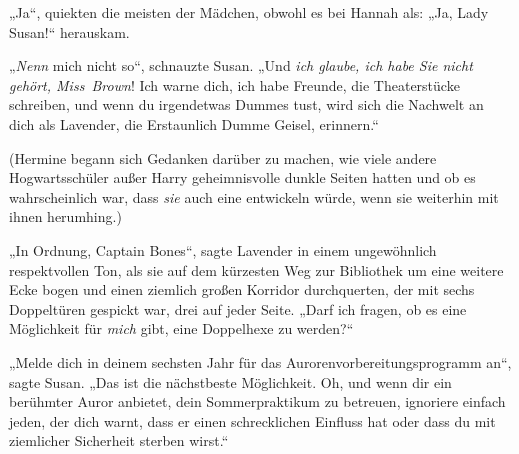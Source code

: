 „Ja“, quiekten die meisten der Mädchen, obwohl es bei Hannah als: „Ja, Lady Susan!“ herauskam.

„\emph{Nenn} mich nicht so“, schnauzte Susan. „Und \emph{ich glaube, ich habe Sie nicht gehört, Miss~Brown}! Ich warne dich, ich habe Freunde, die Theaterstücke schreiben, und wenn du irgendetwas Dummes tust, wird sich die Nachwelt an dich als Lavender, die Erstaunlich Dumme Geisel, erinnern.“

(Hermine begann sich Gedanken darüber zu machen, wie viele andere Hogwartsschüler außer Harry geheimnisvolle dunkle Seiten hatten und ob es wahrscheinlich war, dass \emph{sie} auch eine entwickeln würde, wenn sie weiterhin mit ihnen herumhing.)

„In Ordnung, Captain Bones“, sagte Lavender in einem ungewöhnlich respektvollen Ton, als sie auf dem kürzesten Weg zur Bibliothek um eine weitere Ecke bogen und einen ziemlich großen Korridor durchquerten, der mit sechs Doppeltüren gespickt war, drei auf jeder Seite. „Darf ich fragen, ob es eine Möglichkeit für \emph{mich} gibt, eine Doppelhexe zu werden?“

„Melde dich in deinem sechsten Jahr für das Aurorenvorbereitungsprogramm an“, sagte Susan. „Das ist die nächstbeste Möglichkeit. Oh, und wenn dir ein berühmter Auror anbietet, dein Sommerpraktikum zu betreuen, ignoriere einfach jeden, der dich warnt, dass er einen schrecklichen Einfluss hat oder dass du mit ziemlicher Sicherheit sterben wirst.“

